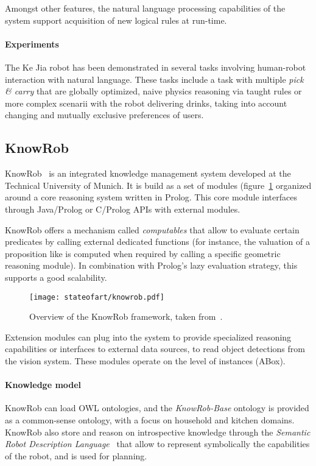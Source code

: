 Amongst other features, the natural language processing capabilities of the
system support acquisition of new logical rules at run-time.

\paragraph{Experiments} The Ke Jia robot has been demonstrated in several tasks
involving human-robot interaction with natural language. These tasks include a
task with multiple \emph{pick \& carry} that are globally optimized, naive
physics reasoning via taught rules or more complex scenarii with the robot
delivering drinks, taking into account changing and mutually exclusive
preferences of users.


\subsection{KnowRob}
\label{sect|knowrob}


{\sc KnowRob}~\cite{Tenorth2009a} is an integrated knowledge management system
developed at the Technical University of Munich. It is build as a set of
modules (figure~\ref{fig|knowrob} organized around a core reasoning system
written in Prolog. This core module interfaces through Java/Prolog or
C/Prolog APIs with external modules.

{\sc KnowRob} offers a mechanism called \emph{computables} that allow to
evaluate certain predicates by calling external dedicated functions (for
instance, the valuation of a proposition like  is
computed when required by calling a specific geometric reasoning module). In
combination with Prolog's lazy evaluation strategy, this supports a good
scalability.

\begin{figure}
    \centering
    \texttt{[image: stateofart/knowrob.pdf]}

    \caption{Overview of the {\sc KnowRob} framework, taken
    from~\cite{Tenorth2011}.}

    \label{fig|knowrob}
\end{figure}

Extension modules can plug into the system to provide specialized reasoning
capabilities or interfaces to external data sources, \eg to read object
detections from the vision system. These modules operate on the level of
instances (ABox).

\paragraph{Knowledge model} {\sc KnowRob} can load OWL ontologies, and the
\emph{KnowRob-Base} ontology is provided as a common-sense ontology, with a
focus on household and kitchen domains. {\sc KnowRob} also store and reason on
introspective knowledge through the \emph{Semantic Robot Description
Language}~\cite{Kunze2011} that allow to represent symbolically the
capabilities of the robot, and is used for planning.



